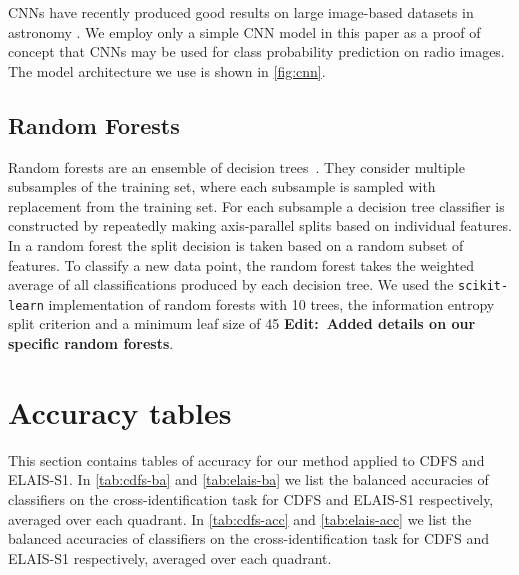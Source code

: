 \documentclass[fleqn,usenatbib,usedcolumn]{mnras}
\newcommand{\edit}[1]{{\bf Edit:~{#1}}}
\begin{document}
    CNNs have recently produced good results on large image-based datasets in astronomy \citep[e.g.][; Lukic et al. in prep]{dieleman15cnn}. We employ only a simple CNN model in this paper as a proof of concept that CNNs may be used for class probability prediction on radio images. The model architecture we use is shown in \autoref{fig:cnn}.

  \subsection{Random Forests}
  \label{sec:random-forests}

    Random forests are an ensemble of decision trees~\citep{breiman01random-forest}. They consider multiple subsamples of the training set, where each subsample is sampled with replacement from the training set. For each subsample a decision tree classifier is constructed by repeatedly making axis-parallel splits based on individual features. In a random forest the split decision is taken based on a random subset of features. To classify a new data point, the random forest takes the weighted average of all classifications produced by each decision tree. We used the \texttt{scikit-learn} implementation of random forests with 10 trees, the information entropy split criterion and a minimum leaf size of 45 \edit{Added details on our specific random forests}.

\section{Accuracy tables}\label{app:accuracies}
  
  This section contains tables of accuracy for our method applied to CDFS and ELAIS-S1. In \autoref{tab:cdfs-ba} and \autoref{tab:elais-ba} we list the balanced accuracies of classifiers on the cross-identification task for CDFS and ELAIS-S1 respectively, averaged over each quadrant. In \autoref{tab:cdfs-acc} and \autoref{tab:elais-acc} we list the balanced accuracies of classifiers on the cross-identification task for CDFS and ELAIS-S1 respectively, averaged over each quadrant.
\end{document}
